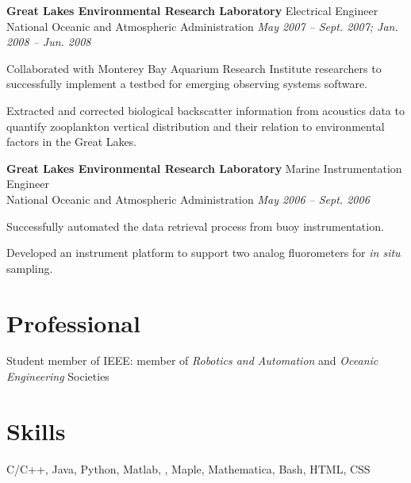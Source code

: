\documentclass[margin, line]{resume}
\begin{document}
\begin{resume}
    \textbf{Great Lakes Environmental Research Laboratory } \hfill  Electrical Engineer \\ 
	National Oceanic and Atmospheric Administration \hfill \textsl{May 2007 -- Sept. 2007; Jan. 2008 -- Jun. 2008}  \\
    \vspace{ -2 mm}	
    \begin{list2}
	\item Collaborated with Monterey Bay Aquarium Research Institute researchers to successfully implement a testbed for emerging 	observing systems software.
	\item Extracted and corrected biological backscatter information from acoustics data to quantify zooplankton vertical distribution and 	their relation to environmental factors in the Great Lakes.
    \end{list2}\vspace{-2mm}

    \textbf{Great Lakes Environmental Research Laboratory } \hfill Marine Instrumentation Engineer  \\ 
	National Oceanic and Atmospheric Administration \hfill \textsl{May 2006 -- Sept. 2006} \\
    \vspace{ -2 mm}	
    \begin{list2}
	\item Successfully automated the data retrieval process from buoy instrumentation.
	\item Developed an instrument platform to support two analog fluorometers for \textit{in situ} sampling.
    \end{list2}\vspace{-2mm}

    \section{\mysidestyle Professional} 

    Student member of IEEE: member of \textsl{Robotics and Automation} and \textsl{Oceanic Engineering} Societies  
	    
	\vspace{-4mm}
    \section{\mysidestyle Skills} 

    C/C++, Java, Python, Matlab, \LaTeXe, Maple, Mathematica, Bash, HTML, CSS

\end{resume}
\end{document}
